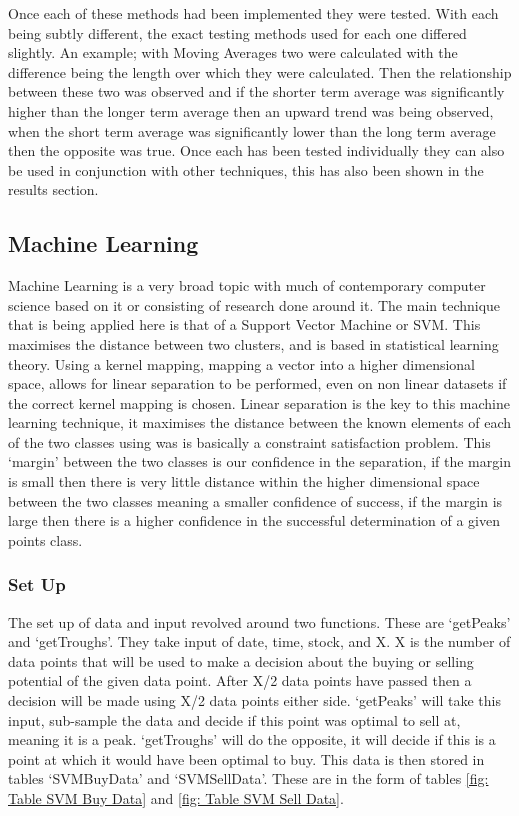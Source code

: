 \documentclass[conference]{IEEEtran}
\begin{document}
Once each of these methods had been implemented they were tested. With each being subtly different, the exact testing methods used for each one differed slightly. An example; with Moving Averages two were calculated with the difference being the length over which they were calculated. Then the relationship between these two was observed and if the shorter term average was significantly higher than the longer term average then an upward trend was being observed, when the short term average was significantly lower than the long term average then the opposite was true. Once each has been tested individually they can also be used in conjunction with other techniques, this has also been shown in the results section. 

\subsection{Machine Learning}
 \noindent
Machine Learning is a very broad topic with much of contemporary computer science based on it or consisting of research done around it. The main technique that is being applied here is that of a Support Vector Machine or SVM. This maximises the distance between two clusters, and is based in statistical learning theory. Using a kernel mapping, mapping a vector into a higher dimensional space, allows for linear separation to be performed, even on non linear datasets if the correct kernel mapping is chosen. Linear separation is the key to this machine learning technique, it maximises the distance between the known elements of each of the two classes using was is basically a constraint satisfaction problem. This `margin' between the two classes is our confidence in the separation, if the margin is small then there is very little distance within the higher dimensional space between the two classes meaning a smaller confidence of success, if the margin is large then there is a higher confidence in the successful determination of a given points class. \cite{Wilson2008}\\

\subsubsection{Set Up}

The set up of data and input revolved around two functions. These are `getPeaks' and `getTroughs'.
They take input of date, time, stock, and X. X is the number of data points that will be used to make a decision about the buying or selling potential of the given data point. After X/2 data points have passed then a decision will be made using X/2 data points either side. `getPeaks' will take this input, sub-sample the data and decide if this point was optimal to sell at, meaning it is a peak. `getTroughs' will do the opposite, it will decide if this is a point at which it would have been optimal to buy. This data is then stored in tables `SVMBuyData' and `SVMSellData'. These are in the form of tables \ref{fig: Table SVM Buy Data} and \ref{fig: Table SVM Sell Data}.
\end{document}
